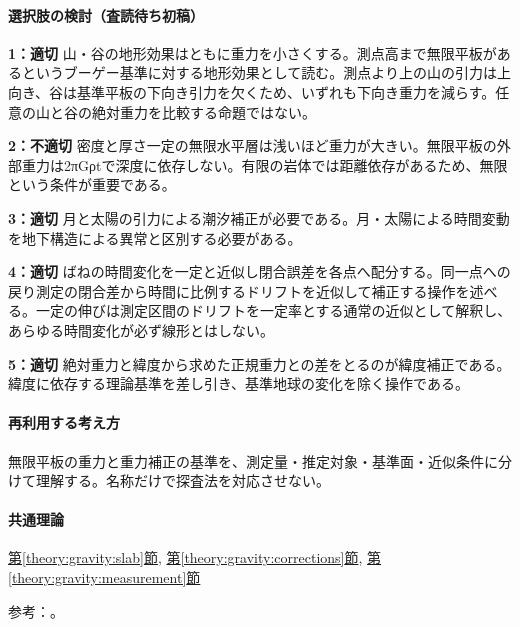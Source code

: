 \paragraph{選択肢の検討（査読待ち初稿）}\mbox{}\par

\noindent\textbf{1：適切} 山・谷の地形効果はともに重力を小さくする。測点高まで無限平板があるというブーゲー基準に対する地形効果として読む。測点より上の山の引力は上向き、谷は基準平板の下向き引力を欠くため、いずれも下向き重力を減らす。任意の山と谷の絶対重力を比較する命題ではない。\par

\noindent\textbf{2：不適切} 密度と厚さ一定の無限水平層は浅いほど重力が大きい。無限平板の外部重力は2πGρtで深度に依存しない。有限の岩体では距離依存があるため、無限という条件が重要である。\par

\noindent\textbf{3：適切} 月と太陽の引力による潮汐補正が必要である。月・太陽による時間変動を地下構造による異常と区別する必要がある。\par

\noindent\textbf{4：適切} ばねの時間変化を一定と近似し閉合誤差を各点へ配分する。同一点への戻り測定の閉合差から時間に比例するドリフトを近似して補正する操作を述べる。一定の伸びは測定区間のドリフトを一定率とする通常の近似として解釈し、あらゆる時間変化が必ず線形とはしない。\par

\noindent\textbf{5：適切} 絶対重力と緯度から求めた正規重力との差をとるのが緯度補正である。緯度に依存する理論基準を差し引き、基準地球の変化を除く操作である。\par

\paragraph{再利用する考え方} 無限平板の重力と重力補正の基準を、測定量・推定対象・基準面・近似条件に分けて理解する。名称だけで探査法を対応させない。

\paragraph{共通理論} \hyperref[theory:gravity:slab]{第\ref*{theory:gravity:slab}節}, \hyperref[theory:gravity:corrections]{第\ref*{theory:gravity:corrections}節}, \hyperref[theory:gravity:measurement]{第\ref*{theory:gravity:measurement}節}

\par 参考：\cite{gsi_gravity_definitions}。

